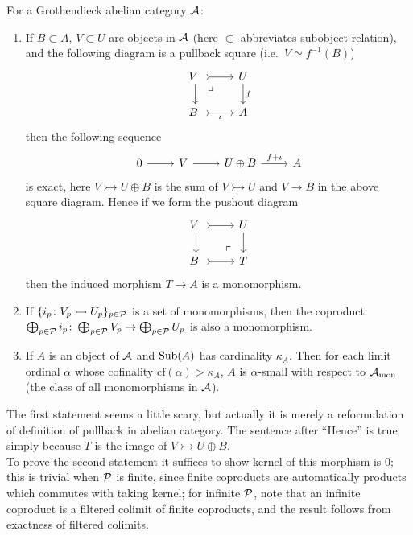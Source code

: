 \documentclass[twoside]{article}
\begin{document}
\begin{fact}\label{fact2} For a Grothendieck abelian category ${\mathcal{A}}$:
\begin{enumerate}[format=\textup]
\item If $B \subset A$, $V \subset U$ are objects in ${\mathcal{A}}$ (here $\subset$ abbreviates subobject relation), and the following diagram is a pullback square (i.e.\ $V \simeq f^{-1}(B)$)
$$\begin{tikzcd}
    V \ \ar[r, tail] \ar[d] \pullback& U \ar[d, "f"]\\
B \ \ar[r, tail, "\iota"'] & A
\end{tikzcd}$$
then the following sequence 
$$\begin{tikzcd}
    0 \ar[r] & V \ar[r] & U \oplus B \ar[r, "f + \iota"] & A
\end{tikzcd}$$
is exact, here $V \rightarrowtail U \oplus B$ is the sum of $V \rightarrowtail U$ and $V \rightarrow B$ in the above square diagram. Hence if we form the pushout diagram
$$\begin{tikzcd}
    V \ \ar[r, tail] \ar[d] & U \ar[d]\\
B \ \ar[r, tail] & T \pushout
\end{tikzcd}$$
then the induced morphism $T \rightarrow A$ is a monomorphism.
\item If $\{i_p\colon V_p \rightarrowtail U_p\}_{p \in {\mathcal{P}}}$ is a set of monomorphisms, then the coproduct $\bigoplus_{p \in {\mathcal{P}}} i_p\colon \bigoplus_{p \in {\mathcal{P}}} V_p \rightarrow \bigoplus_{p \in {\mathcal{P}}} U_p$ is also a monomorphism.
\item If $A$ is an object of ${\mathcal{A}}$ and $\mathrm{Sub}(A)$ has cardinality $\kappa_A$. Then for each limit ordinal $\alpha$ whose cofinality $\mathrm{cf}(\alpha) > \kappa_A$, $A$ is $\alpha$-small with respect to ${\mathcal{A}}_{\mathrm{mon}}$ (the class of all monomorphisms in ${\mathcal{A}}$).
\end{enumerate}
\end{fact}
The first statement seems a little scary, but actually it is merely a reformulation of definition of pullback in abelian category. The sentence after ``Hence'' is true simply because $T$ is the image of $V \rightarrowtail U \oplus B$.\\

To prove the second statement it suffices to show kernel of this morphism is $0$; this is trivial when ${\mathcal{P}}$ is finite, since finite coproducts are automatically products which commutes with taking kernel; for infinite ${\mathcal{P}}$, note that an infinite coproduct is a filtered colimit of finite coproducts,  and the result follows from exactness of filtered colimits.\\
\end{document}
